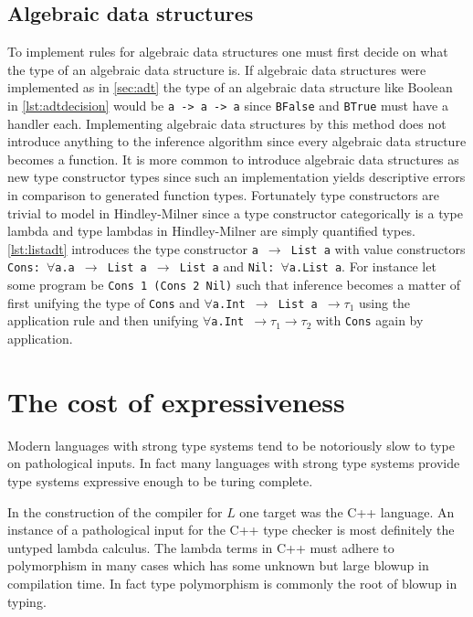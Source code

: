 \documentclass[11pt,oneside,a4paper]{report}
\begin{document}
\subsection{Algebraic data structures}
To implement rules for algebraic data structures one must first decide on what the type of an algebraic data structure is.
If algebraic data structures were implemented as in \autoref{sec:adt} the type of an algebraic data structure like Boolean in \autoref{lst:adtdecision} would be \texttt{a -> a -> a} since \texttt{BFalse} and \texttt{BTrue} must have a handler each.
Implementing algebraic data structures by this method does not introduce anything to the inference algorithm since every algebraic data structure becomes a function.
It is more common to introduce algebraic data structures as new type constructor types since such an implementation yields descriptive errors in comparison to generated function types.
Fortunately type constructors are trivial to model in Hindley-Milner since a type constructor categorically is a type lambda and type lambdas in Hindley-Milner are simply quantified types.
\autoref{lst:listadt} introduces the type constructor \texttt{a $\rightarrow$ List a} with value constructors \texttt{Cons: $\forall$a.a $\rightarrow$ List a $\rightarrow$ List a} and \texttt{Nil: $\forall$a.List a}.
For instance let some program be \texttt{Cons 1 (Cons 2 Nil)} such that inference becomes a matter of first unifying the type of \texttt{Cons} and \texttt{$\forall$a.Int $\rightarrow$ List a $\rightarrow \tau_1$} using the application rule and then unifying \texttt{$\forall$a.Int $\rightarrow \tau_1 \rightarrow \tau_2$} with \texttt{Cons} again by application.


\section{The cost of expressiveness}
Modern languages with strong type systems tend to be notoriously slow to type on pathological inputs.
In fact many languages with strong type systems provide type systems expressive enough to be turing complete.

In the construction of the compiler for $L$ one target was the C++ language.
An instance of a pathological input for the C++ type checker is most definitely the untyped lambda calculus.
The lambda terms in C++ must adhere to polymorphism in many cases which has some unknown but large blowup in compilation time.
In fact type polymorphism is commonly the root of blowup in typing.
\end{document}
